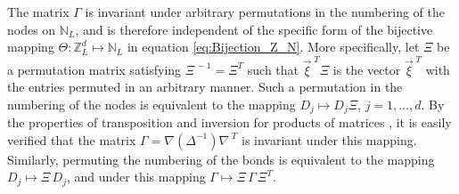 \documentclass{cmslatex}
\begin{document}
The matrix $\Gamma$ is invariant under arbitrary permutations in the
numbering of the nodes on $\mathbb{N}_L$, and is therefore independent
of the specific form of the bijective mapping
$\Theta:\mathbb{Z}_L^d\mapsto\mathbb{N}_L$ in equation 
\eqref{eq:Bijection_Z_N}. More specifically, let $\Xi$ be a permutation
matrix satisfying $\Xi^{\,-1}=\Xi^T$ such that $\vec{\xi}^{\; T}\Xi$ is the vector
$\vec{\xi}^{\; T}$ with the entries permuted in an arbitrary manner. Such
a permutation in the numbering of the nodes is equivalent to the
mapping $D_j\mapsto D_j\Xi$, $j=1,\ldots,d$. By the properties of transposition and
inversion for products of matrices \cite{Horn_Johnson-1990}, it is
easily verified that the matrix $\Gamma=\nabla(\Delta^{-1})\nabla^{\;T}$ is invariant under this mapping. Similarly,
permuting the numbering of the bonds is equivalent to the mapping
$D_j\mapsto \Xi\,D_j$, and under this mapping $\Gamma\mapsto \Xi\,\Gamma\, \Xi^T$.
\end{document}

